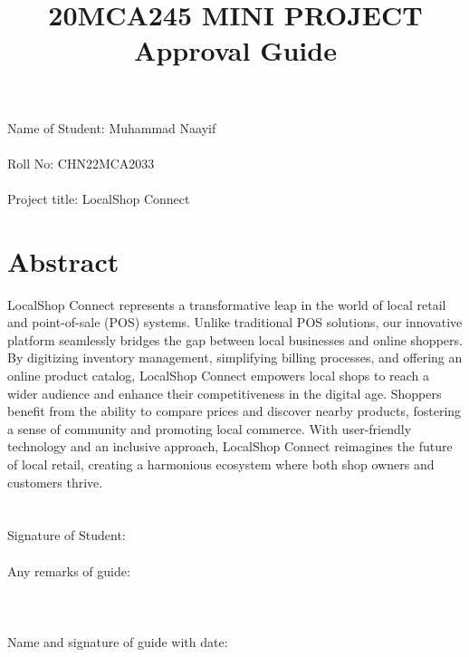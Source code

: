 \documentclass[a4paper]{article}
\title{20MCA245 MINI PROJECT\\Approval Guide}
\author{}
\date{}
\begin{document}
\maketitle
\section*{}
Name of Student: Muhammad Naayif\\\\Roll No: CHN22MCA2033\\\\Project title: LocalShop Connect

\section*{Abstract} %
LocalShop Connect represents a transformative leap in the world of local retail and point-of-sale (POS) systems. Unlike traditional POS solutions, our innovative platform seamlessly bridges the gap between local businesses and online shoppers. By digitizing inventory management, simplifying billing processes, and offering an online product catalog, LocalShop Connect empowers local shops to reach a wider audience and enhance their competitiveness in the digital age. Shoppers benefit from the ability to compare prices and discover nearby products, fostering a sense of community and promoting local commerce. With user-friendly technology and an inclusive approach, LocalShop Connect reimagines the future of local retail, creating a harmonious ecosystem where both shop owners and customers thrive.
\section*{}
Signature of Student:\\\\Any remarks of guide:\\\\
\section*{}Name and signature of guide with date: 
\end{document}
